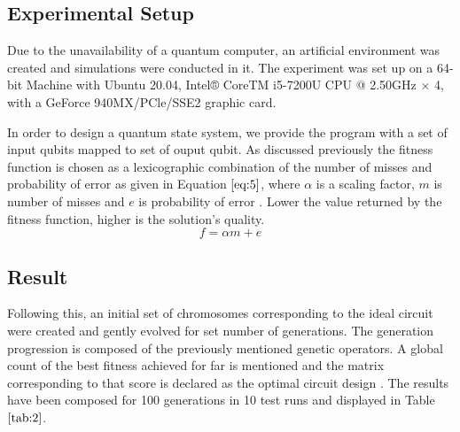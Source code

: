 \documentclass[conference]{IEEEtran}
\begin{document}
\subsection{Experimental Setup}
Due to the unavailability of a quantum computer, an artificial environment was created and simulations were conducted in it. The experiment was set up on a 64-bit Machine with Ubuntu 20.04, Intel® CoreTM i5-7200U CPU @ 2.50GHz × 4, with a GeForce 940MX/PCle/SSE2 graphic card. 

In order to design a quantum state system, we provide the program with a set of input qubits mapped to set of ouput qubit. As discussed previously the fitness function is chosen as a lexicographic combination of the number of misses and probability of error as given in Equation $\ref{eq:5}$, where $\alpha$ is a scaling factor, $\textit{m}$ is number of misses and $\textit{e}$ is probability of error \cite{lex}. Lower the value returned by the fitness function, higher is the solution's quality.
{\scriptsize
\begin{equation}
\label{eq:5}
f = \alpha m + e
\end{equation}
}%

\subsection{Result}
Following this, an initial set of chromosomes corresponding to the ideal circuit were created and gently evolved for set number of generations. The generation progression is composed of the previously mentioned genetic operators. A global count of the best fitness achieved for far is mentioned and the matrix corresponding to that score is declared as the optimal circuit design \cite{cir}. The results have been composed for 100 generations in 10 test runs and displayed in Table $\ref{tab:2}$.  
\end{document}
